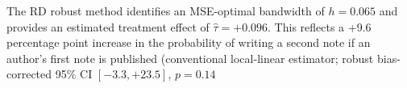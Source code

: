 The RD robust method identifies an MSE-optimal bandwidth of $h = 0.065$ and provides an estimated treatment effect of $\hat{\tau} = +0.096$. This reflects a +9.6 percentage point increase in the probability of writing a second note if an author's first note is published (conventional local-linear estimator; robust bias-corrected 95\% CI $[-3.3, +23.5]$, $p = 0.14$
